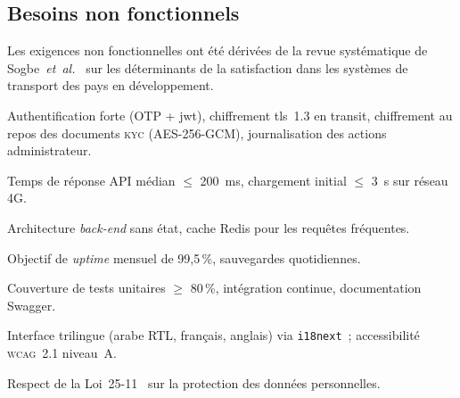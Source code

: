 \clearpage
\subsection{Besoins non fonctionnels}
\label{sec:exigences-nonfonc}

Les exigences non fonctionnelles ont été dérivées de la revue systématique de Sogbe~\textit{et~al.}~\cite{sogbe_public_transport_2024} sur les déterminants de la satisfaction dans les systèmes de transport des pays en développement.

\begin{nonfuncreq}[title={\textbf{ENF~1 --- Sécurité}}]
Authentification forte (OTP + \gls{jwt}), chiffrement \gls{tls}~1.3 en transit, chiffrement au repos des documents \textsc{kyc} (AES-256-GCM), journalisation des actions administrateur.
\end{nonfuncreq}

\begin{nonfuncreq}[title={\textbf{ENF~2 --- Performance}}]
Temps de réponse API médian $\leq$ 200~ms, chargement initial $\leq$ 3~s sur réseau 4G.
\end{nonfuncreq}

\begin{nonfuncreq}[title={\textbf{ENF~3 --- Scalabilité}}]
Architecture \textit{back-end} sans état, cache Redis pour les requêtes fréquentes.
\end{nonfuncreq}

\begin{nonfuncreq}[title={\textbf{ENF~4 --- Disponibilité}}]
Objectif de \textit{uptime} mensuel de 99{,}5\,\%, sauvegardes quotidiennes.
\end{nonfuncreq}

\begin{nonfuncreq}[title={\textbf{ENF~5 --- Maintenabilité}}]
Couverture de tests unitaires $\geq$ 80\,\%, intégration continue, documentation Swagger.
\end{nonfuncreq}

\begin{nonfuncreq}[title={\textbf{ENF~6 --- Ergonomie et accessibilité}}]
Interface trilingue (arabe RTL, français, anglais) via \texttt{i18next}~; accessibilité \textsc{wcag}~2.1 niveau~A.
\end{nonfuncreq}

\begin{nonfuncreq}[title={\textbf{ENF~7 --- Conformité réglementaire}}]
Respect de la Loi~25-11~\cite{loi2511_2025} sur la protection des données personnelles.
\end{nonfuncreq}

